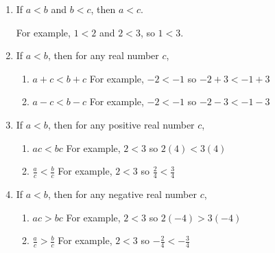 \documentclass[11pt,a4paper]{book}
\begin{document}
\begin{enumerate}

\item If $a<b$ and $b<c$, then $a<c$.

For example, $1<2$ and $2<3$, so $1<3$.

\item If $a<b$, then for any real number $c$,

\begin{enumerate}[label=(\roman*)]

\item $a+c<b+c$ \hspace{1cm} For example, $-2<-1$ so $-2+3<-1+3$

\item $a-c<b-c$ \hspace{1cm} For example, $-2<-1$ so $-2-3<-1-3$

\end{enumerate}

\item  If $a<b$, then for any positive real number $c$,

\begin{enumerate}[label=(\roman*)]

\item $ac<bc$ \hspace{1.86cm} For example, $2<3$ so $2\left(4\right)<3\left(4\right)$

\item ${\displaystyle \frac{a}{c}<\frac{b}{c}}$ \hspace{2cm} For
example, $2<3$ so ${\displaystyle \frac{2}{4}<\frac{3}{4}}$

\end{enumerate}

\item  If $a<b$, then for any negative real number $c$,

\begin{enumerate}[label=(\roman*)]

\item $ac>bc$ \hspace{1.86cm} For example, $2<3$ so $2\left(-4\right)>3\left(-4\right)$

\item ${\displaystyle \frac{a}{c}>\frac{b}{c}}$ \hspace{2cm} For
example, $2<3$ so ${\displaystyle -\frac{2}{4}<-\frac{3}{4}}$

\end{enumerate}

\end{enumerate}
\end{document}
